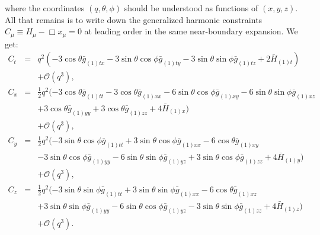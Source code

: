 \documentclass[a4paper,11pt]{article}
\numberwithin{equation}{section}
\begin{document}
where the coordinates $(q,\theta,\phi)$ should be understood as functions of $(x,y,z)$. 
All that remains is to write down the generalized harmonic constraints $C_\mu \equiv H_\mu-\Box x_\mu = 0$ at leading order in the same near-boundary expansion. We get:
\begin{eqnarray}
\label{eqn:ct}
C_t&=&q^2 (-3 \cos \theta \bar{g}_{(1)tx}-3 \sin \theta \cos \phi \bar{g}_{(1)ty}-3 \sin \theta \sin \phi \bar{g}_{(1)tz}+2
  \bar{H}_{(1) t}) \nonumber \\
   &&+\mathcal{O}(q^3),\\
%
\label{eqn:cx}
C_x&=&\frac{1}{2} q^2 (-3 \cos \theta  \bar{g}_{(1)tt}-3 \cos \theta  \bar{g}_{(1)xx}-6 \sin \theta  \cos \phi  \bar{g}_{(1)xy}-6 \sin
   \theta  \sin \phi  \bar{g}_{(1)xz} \nonumber \\
  &&+3 \cos \theta  \bar{g}_{(1)yy}+3
   \cos \theta  \bar{g}_{(1)zz}+4 \bar{H}_{(1) x}) \nonumber \\
   &&+\mathcal{O}(q^3),\\
%
\label{eqn:cy}
C_y&=&\frac{1}{2} q^2 (-3 \sin \theta  \cos \phi  \bar{g}_{(1)tt}+3 \sin
   \theta  \cos \phi  \bar{g}_{(1)xx}-6 \cos \theta  \bar{g}_{(1)xy} \nonumber \\
   &&-3
   \sin \theta  \cos \phi  \bar{g}_{(1) yy}-6 \sin \theta  \sin \phi
   \bar{g}_{(1)yz}+3 \sin \theta  \cos \phi  \bar{g}_{(1)zz}+4
   \bar{H}_{(1) y}) \nonumber \\
   &&+\mathcal{O}(q^3),\\
%
\label{eqn:cz}
C_z&=&\frac{1}{2} q^2 (-3 \sin \theta \sin \phi  \bar{g}_{(1)tt}+3 \sin
   \theta \sin \phi \bar{g}_{(1)xx}-6 \cos \theta  \bar{g}_{(1)xz} \nonumber \\
   &&+3
   \sin \theta \sin \phi  \bar{g}_{(1)yy}-6 \sin \theta  \cos \phi    \bar{g}_{(1)yz}-3 \sin \theta  \sin \phi  \bar{g}_{(1)zz}+4
   \bar{H}_{(1)z}) \nonumber \\
   &&+\mathcal{O}(q^3).
\end{eqnarray}
 
\end{document}

